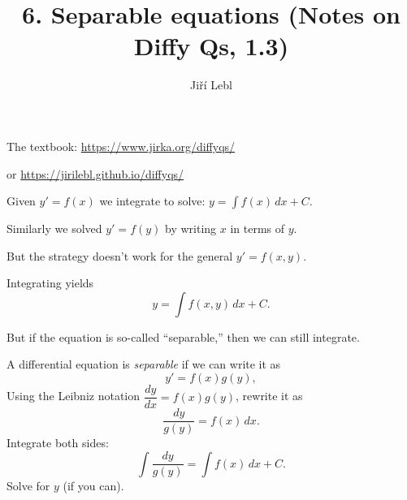 \documentclass[10pt,aspectratio=169]{beamer}
\author{Ji\v{r}\'i Lebl}
\institute[OSU]{%
Oklahoma State University%
}
\title{6. Separable equations (Notes on Diffy Qs, 1.3)}
\date{}
\begin{document}
\begin{frame}
\titlepage


\begin{center}
The textbook: \url{https://www.jirka.org/diffyqs/}

or \url{https://jirilebl.github.io/diffyqs/}
\end{center}
\end{frame}

\begin{frame}
Given
$y' = f(x)$ we integrate to solve: $y = \int f(x) \,dx + C$. 

\medskip
\pause

Similarly we solved $y' = f(y)$ by writing $x$ in terms of $y$.

\medskip
\pause

But the strategy doesn't work for the general $y' = f(x,y)$.

\medskip
\pause

Integrating yields
\[
y = \int f(x,y) \,dx + C .
\]

\medskip
\pause

But if the equation is so-called ``separable,'' then we can
still integrate.

\end{frame}

\begin{frame}

A differential equation is \emph{separable} if we can write it as
\[
y' = f(x)g(y) ,
\]
\pause
Using the Leibniz notation $\dfrac{dy}{dx} = f(x)g(y)$, rewrite it as
\[
\frac{dy}{g(y)} = f(x) \,dx .
\]
\pause
Integrate both sides:
\[
\int \frac{dy}{g(y)} = \int f(x) \,dx + C .
\]
\pause
Solve for $y$ (if you can).

\end{frame}
\end{document}
